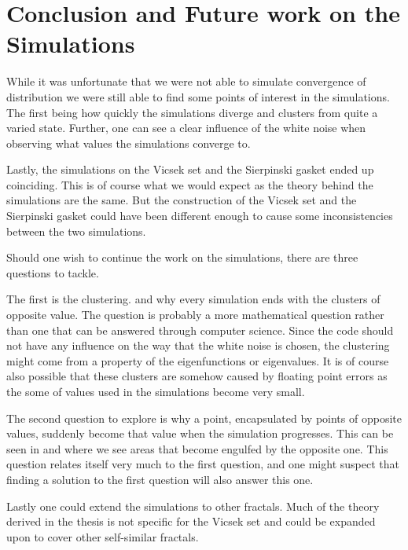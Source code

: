 \clearpage
\section[Conclusion and Future work on the Simulations]{Conclusion and Future work on the \\ Simulations}

While it was unfortunate that we were not able to simulate convergence of distribution we were still able to find some points of interest in the simulations. The first being how quickly the simulations diverge and clusters from quite a varied state. Further, one can see a clear influence of the white noise when observing what values the simulations converge to.

Lastly, the simulations on the Vicsek set and the Sierpinski gasket ended up coinciding. This is of course what we would expect as the theory behind the simulations are the same. But the construction of the Vicsek set and the Sierpinski gasket could have been different enough to cause some inconsistencies between the two simulations. 

\medskip
Should one wish to continue the work on the simulations, there are three questions to tackle. 

The first is the clustering. and why every simulation ends with the clusters of opposite value. The question is probably a more mathematical question rather than one that can be answered through computer science. Since the code should not have any influence on the way that the white noise is chosen, the clustering might come from a property of the eigenfunctions or eigenvalues. It is of course also possible that these clusters are somehow caused by floating point errors as the some of values used in the simulations become very small.

The second question to explore is why a point, encapsulated by points of opposite values, suddenly become that value when the simulation progresses. This can be seen in  and  where we see areas that become engulfed by the opposite one. This question relates itself very much to the first question, and one might suspect that finding a solution to the first question will also answer this one. 

Lastly one could extend the simulations to other fractals. Much of the theory derived in the thesis is not specific for the Vicsek set and could be expanded upon to cover other self-similar fractals.



